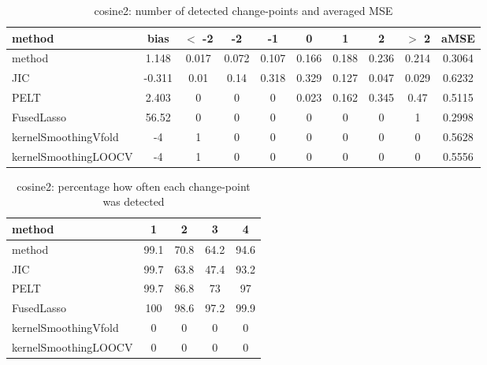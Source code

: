 \begin{table}[ht]
\centering
\begin{tabular}{l|c|ccccccc|c}
  \hline
method & bias & $<$ -2 & -2 & -1 & 0 & 1 & 2 & $>$ 2 & aMSE \\ 
  \hline
method & 1.148 & 0.017 & 0.072 & 0.107 & 0.166 & 0.188 & 0.236 & 0.214 & 0.3064 \\ 
  JIC & -0.311 &  0.01 &  0.14 & 0.318 & 0.329 & 0.127 & 0.047 & 0.029 & 0.6232 \\ 
  PELT & 2.403 &     0 &     0 &     0 & 0.023 & 0.162 & 0.345 &  0.47 & 0.5115 \\ 
  FusedLasso & 56.52 &     0 &     0 &     0 &     0 &     0 &     0 &     1 & 0.2998 \\ 
  kernelSmoothingVfold &    -4 &     1 &     0 &     0 &     0 &     0 &     0 &     0 & 0.5628 \\ 
  kernelSmoothingLOOCV &    -4 &     1 &     0 &     0 &     0 &     0 &     0 &     0 & 0.5556 \\ 
   \hline
\end{tabular}
\caption{cosine2: number of detected change-points and averaged MSE} 
\label{tab:cosine2Njumps}
\end{table}
\begin{table}[ht]
\centering
\begin{tabular}{l|cccc}
  \hline
method & 1 & 2 & 3 & 4 \\ 
  \hline
method &   99.1 &   70.8 &   64.2 &   94.6 \\ 
  JIC &   99.7 &   63.8 &   47.4 &   93.2 \\ 
  PELT &   99.7 &   86.8 &     73 &     97 \\ 
  FusedLasso &    100 &   98.6 &   97.2 &   99.9 \\ 
  kernelSmoothingVfold &      0 &      0 &      0 &      0 \\ 
  kernelSmoothingLOOCV &      0 &      0 &      0 &      0 \\ 
   \hline
\end{tabular}
\caption{cosine2: percentage how often each change-point was detected} 
\label{tab:cosine2Detections}
\end{table}
